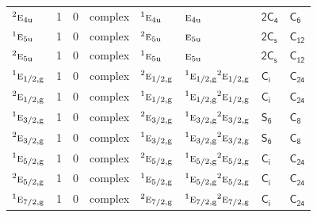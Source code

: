 \documentclass[10pt,a4paper]{article}
\makeatletter
\def\grouprule#1#2{\noalign{\marks\LTgroupmarks{\the\belowrulesep}\nobreak\vskip#1%
  \vskip\aboverulesep}\multispan\LT@cols\unskip{\leaders\hrule\@height#2\hfill\kern\z@}\cr
  \noalign{\penalty\LTrulebreak\vskip\belowrulesep\global\@lastruleclass\z@}}
\numberwithin{equation}{section}
\newcommand{\grp}[1]{\mathsf{#1}}
\newcommand{\irr}[1]{\text{\normalfont\scshape #1}}
\newcommand{\conjpair}[1]{{}^{#1}}
\newcommand{\ptag}[1]{\mathrm{#1}}
\makeatother
\begin{document}
{\begin{longtable}{@{}lrrlllll@{}}
$\conjpair{2}\irr{e}_{4\ptag{u}}$ & 1 & $0$ & complex & $\conjpair{1}\irr{e}_{4\ptag{u}}$ & $\irr{e}_{4\ptag{u}}$ & \href{2C4.pdf}{$\grp{2C_{4}}$} & \href{../../../rotation/data/pdf/C6.pdf}{$\grp{C_{6}}$}\\
$\conjpair{1}\irr{e}_{5\ptag{u}}$ & 1 & $0$ & complex & $\conjpair{2}\irr{e}_{5\ptag{u}}$ & $\irr{e}_{5\ptag{u}}$ & \href{2C1v.pdf}{$\grp{2C_{s}}$} & \href{../../../rotation/data/pdf/C12.pdf}{$\grp{C_{12}}$}\\
$\conjpair{2}\irr{e}_{5\ptag{u}}$ & 1 & $0$ & complex & $\conjpair{1}\irr{e}_{5\ptag{u}}$ & $\irr{e}_{5\ptag{u}}$ & \href{2C1v.pdf}{$\grp{2C_{s}}$} & \href{../../../rotation/data/pdf/C12.pdf}{$\grp{C_{12}}$}\\
\grouprule{0pt}{\lightrulewidth}
$\conjpair{1}\irr{e}_{1/2,\ptag{g}}$ & 1 & $0$ & complex & $\conjpair{2}\irr{e}_{1/2,\ptag{g}}$ & $\conjpair{1}\irr{e}_{1/2,\ptag{g}}\conjpair{2}\irr{e}_{1/2,\ptag{g}}$ & \href{S2.pdf}{$\grp{C_{i}}$} & $\grp{C_{24}}$\\
$\conjpair{2}\irr{e}_{1/2,\ptag{g}}$ & 1 & $0$ & complex & $\conjpair{1}\irr{e}_{1/2,\ptag{g}}$ & $\conjpair{1}\irr{e}_{1/2,\ptag{g}}\conjpair{2}\irr{e}_{1/2,\ptag{g}}$ & \href{S2.pdf}{$\grp{C_{i}}$} & $\grp{C_{24}}$\\
$\conjpair{1}\irr{e}_{3/2,\ptag{g}}$ & 1 & $0$ & complex & $\conjpair{2}\irr{e}_{3/2,\ptag{g}}$ & $\conjpair{1}\irr{e}_{3/2,\ptag{g}}\conjpair{2}\irr{e}_{3/2,\ptag{g}}$ & \href{S6.pdf}{$\grp{S_{6}}$} & \href{../../../rotation/data/pdf/C8.pdf}{$\grp{C_{8}}$}\\
$\conjpair{2}\irr{e}_{3/2,\ptag{g}}$ & 1 & $0$ & complex & $\conjpair{1}\irr{e}_{3/2,\ptag{g}}$ & $\conjpair{1}\irr{e}_{3/2,\ptag{g}}\conjpair{2}\irr{e}_{3/2,\ptag{g}}$ & \href{S6.pdf}{$\grp{S_{6}}$} & \href{../../../rotation/data/pdf/C8.pdf}{$\grp{C_{8}}$}\\
$\conjpair{1}\irr{e}_{5/2,\ptag{g}}$ & 1 & $0$ & complex & $\conjpair{2}\irr{e}_{5/2,\ptag{g}}$ & $\conjpair{1}\irr{e}_{5/2,\ptag{g}}\conjpair{2}\irr{e}_{5/2,\ptag{g}}$ & \href{S2.pdf}{$\grp{C_{i}}$} & $\grp{C_{24}}$\\
$\conjpair{2}\irr{e}_{5/2,\ptag{g}}$ & 1 & $0$ & complex & $\conjpair{1}\irr{e}_{5/2,\ptag{g}}$ & $\conjpair{1}\irr{e}_{5/2,\ptag{g}}\conjpair{2}\irr{e}_{5/2,\ptag{g}}$ & \href{S2.pdf}{$\grp{C_{i}}$} & $\grp{C_{24}}$\\
$\conjpair{1}\irr{e}_{7/2,\ptag{g}}$ & 1 & $0$ & complex & $\conjpair{2}\irr{e}_{7/2,\ptag{g}}$ & $\conjpair{1}\irr{e}_{7/2,\ptag{g}}\conjpair{2}\irr{e}_{7/2,\ptag{g}}$ & \href{S2.pdf}{$\grp{C_{i}}$} & $\grp{C_{24}}$\\

\end{longtable}}
\end{document}
